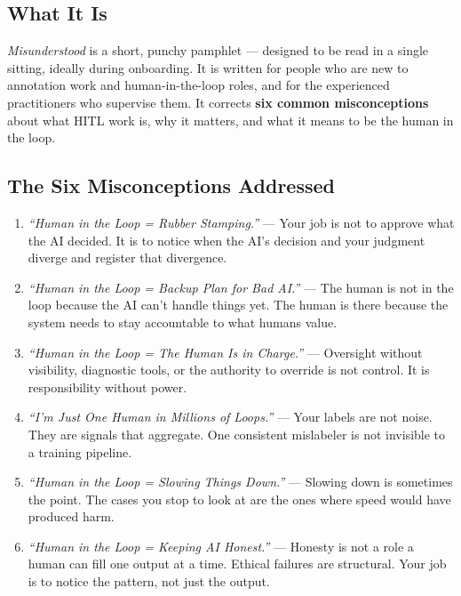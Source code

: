 \documentclass[12pt, a4paper]{article}
\begin{document}
\begin{tcolorbox}[editionbox=autumnred, title=Autumn Edition \textbullet\ Practitioner Pamphlet]

\subsection*{\color{charcoal} What It Is}

\textit{Misunderstood} is a short, punchy pamphlet — designed to be read in a single sitting, ideally during onboarding. It is written for people who are new to annotation work and human-in-the-loop roles, and for the experienced practitioners who supervise them. It corrects \textbf{six common misconceptions} about what HITL work is, why it matters, and what it means to be the human in the loop.

\subsection*{\color{charcoal} The Six Misconceptions Addressed}

\begin{enumerate}
  \item \textit{``Human in the Loop = Rubber Stamping.''} — Your job is not to approve what the AI decided. It is to notice when the AI's decision and your judgment diverge and register that divergence.
  \item \textit{``Human in the Loop = Backup Plan for Bad AI.''} — The human is not in the loop because the AI can't handle things yet. The human is there because the system needs to stay accountable to what humans value.
  \item \textit{``Human in the Loop = The Human Is in Charge.''} — Oversight without visibility, diagnostic tools, or the authority to override is not control. It is responsibility without power.
  \item \textit{``I'm Just One Human in Millions of Loops.''} — Your labels are not noise. They are signals that aggregate. One consistent mislabeler is not invisible to a training pipeline.
  \item \textit{``Human in the Loop = Slowing Things Down.''} — Slowing down is sometimes the point. The cases you stop to look at are the ones where speed would have produced harm.
  \item \textit{``Human in the Loop = Keeping AI Honest.''} — Honesty is not a role a human can fill one output at a time. Ethical failures are structural. Your job is to notice the pattern, not just the output.
\end{enumerate}


\end{tcolorbox}
\end{document}
